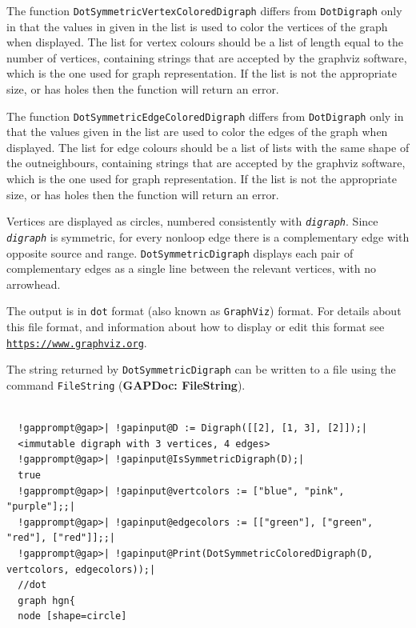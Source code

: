 \documentclass[a4paper,11pt]{report}
\begin{document}
{{{ The function \texttt{DotSymmetricVertexColoredDigraph} differs from \texttt{DotDigraph} only in that the values in given in the list is used to color the vertices of
the graph when displayed. The list for vertex colours should be a list of
length equal to the number of vertices, containing strings that are accepted
by the graphviz software, which is the one used for graph representation. If
the list is not the appropriate size, or has holes then the function will
return an error. 

 The function \texttt{DotSymmetricEdgeColoredDigraph} differs from \texttt{DotDigraph} only in that the values given in the list are used to color the edges of the
graph when displayed. The list for edge colours should be a list of lists with
the same shape of the outneighbours, containing strings that are accepted by
the graphviz software, which is the one used for graph representation. If the
list is not the appropriate size, or has holes then the function will return
an error. 

 Vertices are displayed as circles, numbered consistently with \mbox{\texttt{\mdseries\slshape digraph}}. Since \mbox{\texttt{\mdseries\slshape digraph}} is symmetric, for every non\texttt{}loop edge there is a
complementary edge with opposite source and range. \texttt{DotSymmetricDigraph} displays each pair of complementary edges as a single line between the
relevant vertices, with no arrowhead.

 The output is in \texttt{dot} format (also known as \texttt{GraphViz}) format. For details about this file format, and information about how to
display or edit this format see \href{https://www.graphviz.org} {\texttt{https://www.graphviz.org}}. 

 The string returned by \texttt{DotSymmetricDigraph} can be written to a file using the command \texttt{FileString} (\textbf{GAPDoc: FileString}).

 
\begin{Verbatim}[commandchars=!@|,fontsize=\small,frame=single,label=Example]
  
  !gapprompt@gap>| !gapinput@D := Digraph([[2], [1, 3], [2]]);|
  <immutable digraph with 3 vertices, 4 edges>
  !gapprompt@gap>| !gapinput@IsSymmetricDigraph(D);|
  true
  !gapprompt@gap>| !gapinput@vertcolors := ["blue", "pink", "purple"];;|
  !gapprompt@gap>| !gapinput@edgecolors := [["green"], ["green", "red"], ["red"]];;|
  !gapprompt@gap>| !gapinput@Print(DotSymmetricColoredDigraph(D, vertcolors, edgecolors));|
  //dot
  graph hgn{
  node [shape=circle]
  

\end{Verbatim}}}}
\end{document}
